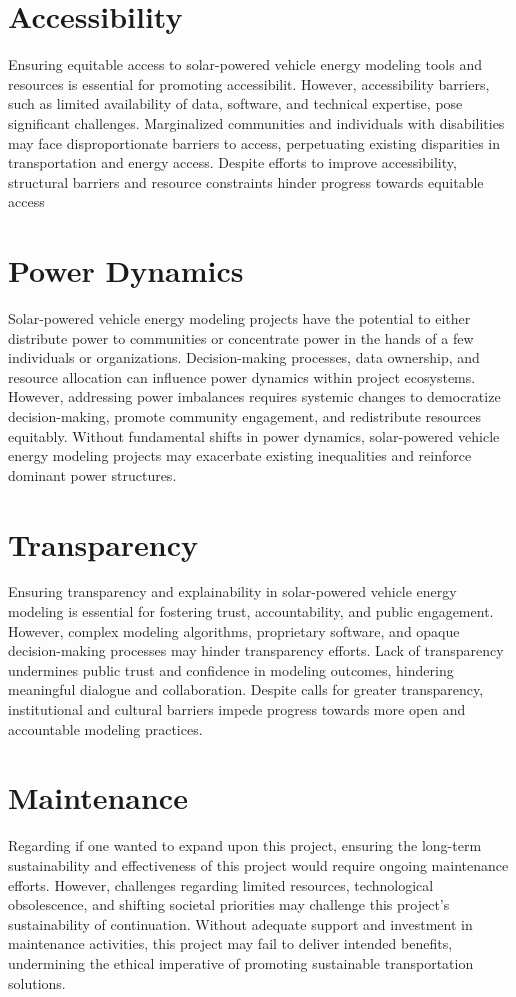\documentclass[10pt,twocolumn]{article}
\begin{document}
\section{Accessibility}
Ensuring equitable access to solar-powered vehicle energy modeling tools and resources is essential for promoting accessibilit. However, accessibility barriers, such as limited availability of data, software, and technical expertise, pose significant challenges. Marginalized communities and individuals with disabilities may face disproportionate barriers to access, perpetuating existing disparities in transportation and energy access. Despite efforts to improve accessibility, structural barriers and resource constraints hinder progress towards equitable access
\section{Power Dynamics}
Solar-powered vehicle energy modeling projects have the potential to either distribute power to communities or concentrate power in the hands of a few individuals or organizations. Decision-making processes, data ownership, and resource allocation can influence power dynamics within project ecosystems. However, addressing power imbalances requires systemic changes to democratize decision-making, promote community engagement, and redistribute resources equitably. Without fundamental shifts in power dynamics, solar-powered vehicle energy modeling projects may exacerbate existing inequalities and reinforce dominant power structures.
\section{Transparency}
Ensuring transparency and explainability in solar-powered vehicle energy modeling is essential for fostering trust, accountability, and public engagement. However, complex modeling algorithms, proprietary software, and opaque decision-making processes may hinder transparency efforts. Lack of transparency undermines public trust and confidence in modeling outcomes, hindering meaningful dialogue and collaboration. Despite calls for greater transparency, institutional and cultural barriers impede progress towards more open and accountable modeling practices.

\section{Maintenance}
Regarding if one wanted to expand upon this project, ensuring the long-term sustainability and effectiveness of this project would require ongoing maintenance efforts. However, challenges regarding limited resources, technological obsolescence, and shifting societal priorities may challenge this project's sustainability of continuation. Without adequate support and investment in maintenance activities, this project may fail to deliver intended benefits, undermining the ethical imperative of promoting sustainable transportation solutions.






\printbibliography
\end{document}
